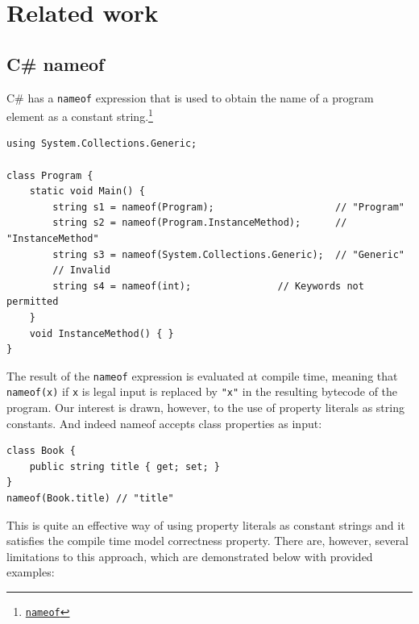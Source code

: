

\chapter{Related work}

\section{C\# nameof}

    C\# has a \texttt{nameof} expression that is used to obtain the name of a program element as a constant string.\footnote{\href{https://docs.microsoft.com/en-us/dotnet/csharp/language-reference/operators/nameof}{\texttt{nameof}}} 

\begin{verbatim}
using System.Collections.Generic;

class Program {
    static void Main() {
        string s1 = nameof(Program);                     // "Program"
        string s2 = nameof(Program.InstanceMethod);      // "InstanceMethod"
        string s3 = nameof(System.Collections.Generic);  // "Generic"
        // Invalid
        string s4 = nameof(int);               // Keywords not permitted
    }
    void InstanceMethod() { }
}
\end{verbatim}

The result of the \texttt{nameof} expression is evaluated at compile time, meaning that \texttt{nameof(x)} if \texttt{x} is legal input is replaced by \texttt{"x"} in the resulting bytecode of the program. Our interest is drawn, however, to the use of property literals as string constants. And indeed nameof accepts class properties as input:

\begin{verbatim}
class Book {
    public string title { get; set; }
}
nameof(Book.title) // "title"
\end{verbatim}

This is quite an effective way of using property literals as constant strings and it satisfies the compile time model correctness property. There are, however, several limitations to this approach, which are demonstrated below with provided examples:


